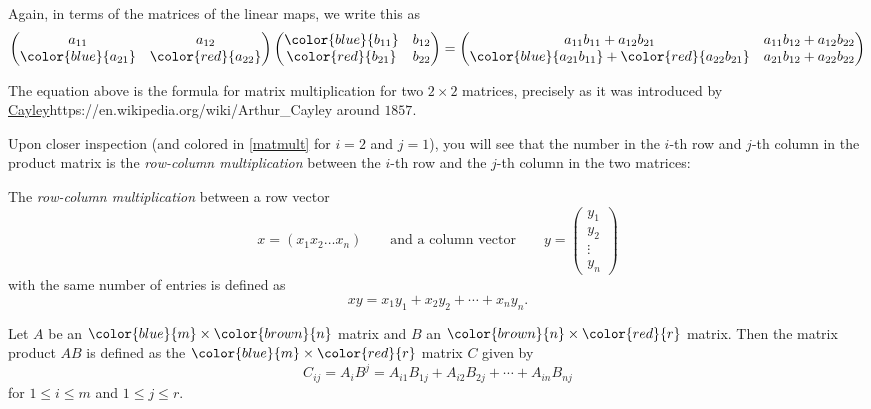 \documentclass{article}
\begin{document}
Again, in terms of the matrices of the linear maps, we write this as
\begin{equation}\label{matmult}
\begin{pmatrix}
a_{11} & a_{12}\\
\color{blue}{a_{21}} & \color{red}{a_{22}}
\end{pmatrix}
\begin{pmatrix}
\color{blue}{b_{11}} & b_{12}\\
\color{red}{b_{21}} & b_{22}
\end{pmatrix}
=
\begin{pmatrix}
a_{11} b_{11} + a_{12} b_{21} & a_{11} b_{12} + a_{12} b_{22}\\
\color{blue}{a_{21} b_{11}} + \color{red}{a_{22} b_{21}} & a_{21} b_{12} + a_{22} b_{22}
\end{pmatrix}
\end{equation}

The equation above is the formula for matrix multiplication for two $2\times 2$ matrices, precisely as
it was introduced
by \url{Cayley}{https://en.wikipedia.org/wiki/Arthur_Cayley} around $1857$.


Upon closer inspection (and colored in \eqref{matmult} for $i=2$ and $j= 1$), you will see that
the number in the $i$-th row and $j$-th column in the product matrix is the
\emph{row-column multiplication} between the $i$-th row and
the $j$-th column in the two matrices:

\begin{frameit}
The \emph{row-column multiplication} between a row vector
$$
x = (x_1 x_2 \dots x_n)\qquad\text{and a column vector}\qquad
y = \begin{pmatrix}
y_1 \\ y_2 \\ \vdots \\ y_n
\end{pmatrix}
$$
with the same number of entries is defined as
$$
x y = x_1 y_1 + x_2 y_2 + \cdots + x_n y_n.
$$
\end{frameit}


\begin{definition}[emph]\label{defmatmult}
  Let $A$ be an  $\color{blue}{m}\times \color{brown}{n}$ matrix and $B$ an $\color{brown}{n}\times \color{red}{r}$ matrix.
  Then the matrix product $A B$ is defined as the $\color{blue}{m}\times\color{red}{r}$ matrix $C$ given by
$$
C_{ij} = A_i B^j = A_{i1} B_{1j} + A_{i2} B_{2j} + \cdots + A_{in} B_{nj}
$$
for $1\leq i \leq m$ and $1\leq j \leq r$.
\end{definition}
\end{document}
